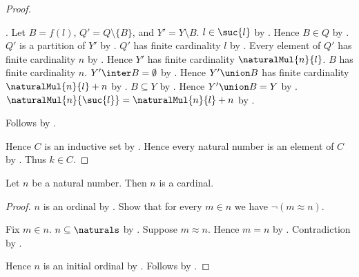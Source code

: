\begin{proof}
\begin{subproof}
\begin{subproof}
                .
            Let $B=f(l)$, $Q'=Q\setminus\{B\}$, and $Y'=Y\setminus B$.
            $l\in\suc{l}$ by .
            Hence $B\in Q$ by
                .
            $Q'$ is a partition of $Y'$ by
                .
            $Q'$ has finite cardinality $l$ by
                .
            Every element of $Q'$ has finite cardinality $n$ by
                .
            Hence $Y'$ has finite cardinality $\naturalMul{n}{l}$.
            $B$ has finite cardinality $n$.
            $Y'\inter B=\emptyset$ by
                .
            Hence $Y'\union B$ has finite cardinality
                $\naturalMul{n}{l}+n$ by
                .
            $B\subseteq Y$ by .
            Hence $Y'\union B=Y$ by
                .
            $\naturalMul{n}{\suc{l}}=\naturalMul{n}{l}+n$ by
                .
        \end{subproof}
        Follows by .
    \end{subproof}
    Hence $C$ is an inductive set by .
    Hence every natural number is an element of $C$ by
        .
    Thus $k\in C$.
\end{proof}

\begin{theorem}\label{natural_number_is_cardinal}
    Let $n$ be a natural number.
    Then $n$ is a cardinal.
\end{theorem}
\begin{proof}
    $n$ is an ordinal by .
    Show that for every $m\in n$ we have $\lnot(m\approx n)$.
    \begin{subproof}
        Fix $m\in n$.
        $n\subseteq\naturals$
            by
            .
        Suppose $m\approx n$.
        Hence $m=n$ by .
        Contradiction by .
    \end{subproof}
    Hence $n$ is an initial ordinal by .
    Follows by .
\end{proof}


